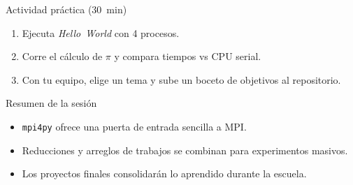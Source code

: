 \documentclass[aspectratio=169,professionalfonts]{beamer}
\begin{document}
\begin{frame}[fragile]{Actividad práctica (30 min)}
  \begin{enumerate}
    \item Ejecuta \textit{Hello World} con 4 procesos.
    \item Corre el cálculo de \(\pi\) y compara tiempos vs CPU serial.
    \item Con tu equipo, elige un tema y sube un boceto de objetivos al repositorio.
  \end{enumerate}
\end{frame}

\begin{frame}[fragile]{Resumen de la sesión}
  \begin{itemize}
    \item \texttt{mpi4py} ofrece una puerta de entrada sencilla a MPI.
    \item Reducciones y arreglos de trabajos se combinan para experimentos masivos.
    \item Los proyectos finales consolidarán lo aprendido durante la escuela.
  \end{itemize}
\end{frame}
\end{document}
